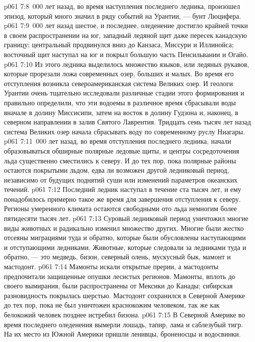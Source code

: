 \vs p061 7:8 \,000 лет назад, во время наступления последнего ледника, произошел эпизод, который много значил в ряду событий на Урантии, --- бунт Люцифера.
\vs p061 7:9 \,000 лет назад шестое, и последнее, оледенение достигло крайней точки в своем распространении на юг, западный ледяной щит даже пересек канадскую границу; центральный продвинулся вниз до Канзаса, Миссури и Иллинойса; восточный щит наступал на юг и покрыл большую часть Пенсильвании и Огайо.
\vs p061 7:10 Из этого ледника выделилось множество языков, или ледяных рукавов, которые прорезали ложа современных озер, больших и малых. Во время его отступления возникла североамериканская система Великих озер. И геологи Урантии очень тщательно исследовали различные стадии этого формирования и правильно определили, что эти водоемы в различное время сбрасывали воды вначале в долину Миссисипи, затем на восток в долину Гудзона и, наконец, в северном направлении в залив Святого Лаврентия. Тридцать семь тысяч лет назад система Великих озер начала сбрасывать воду по современному руслу Ниагары.
\vs p061 7:11 \,000 лет назад, во время отступления последнего ледника, начали образовываться обширные полярные ледовые щиты, и центры сосредоточения льда существенно сместились к северу. И до тех пор, пока полярные районы остаются покрытыми льдом, едва ли возможен другой ледниковый период, независимо от будущих поднятий суши или изменений параметров океанских течений.
\vs p061 7:12 Последний ледник наступал в течение ста тысяч лет, и ему понадобилось примерно такое же время для завершения отступления к северу. Регионы умеренного климата остаются свободными ото льда немногим более пятидесяти тысяч лет.
\vs p061 7:13 Суровый ледниковый период уничтожил многие виды животных и радикально изменил множество других. Многие были жестко отсеяны миграциями туда и обратно, которые были обусловлены наступающими и отступающими ледниками. Животные, которые следовали за ледниками туда и обратно, --- это медведь, бизон, северный олень, мускусный бык, мамонт и мастодонт.
\vs p061 7:14 Мамонты искали открытые прерии, а мастодонты предпочитали защищенные опушки лесистых регионов. Мамонты, вплоть до своего вымирания, были распространены от Мексики до Канады; сибирская разновидность покрылась шерстью. Мастодонт сохранился в Северной Америке до тех пор, пока не был уничтожен краснокожим человеком, так же как белокожий человек позднее истребил бизона.
\vs p061 7:15 В Северной Америке во время последнего оледенения вымерли лошадь, тапир, лама и саблезубый тигр. На их место из Южной Америки пришли ленивцы, броненосцы и водосвинки.

